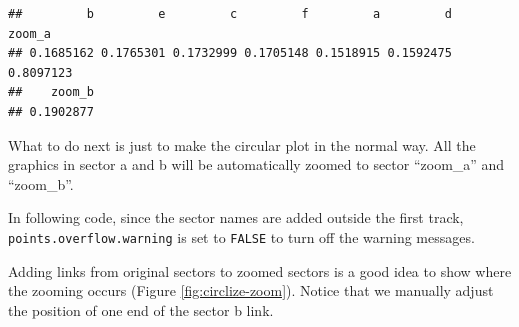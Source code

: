 \documentclass[]{book}
\newenvironment{Shaded}{\begin{snugshade}}{\end{snugshade}}
\newcommand{\KeywordTok}[1]{\textcolor[rgb]{0.13,0.29,0.53}{\textbf{#1}}}
\newcommand{\DataTypeTok}[1]{\textcolor[rgb]{0.13,0.29,0.53}{#1}}
\newcommand{\DecValTok}[1]{\textcolor[rgb]{0.00,0.00,0.81}{#1}}
\newcommand{\FloatTok}[1]{\textcolor[rgb]{0.00,0.00,0.81}{#1}}
\newcommand{\StringTok}[1]{\textcolor[rgb]{0.31,0.60,0.02}{#1}}
\newcommand{\OtherTok}[1]{\textcolor[rgb]{0.56,0.35,0.01}{#1}}
\newcommand{\ControlFlowTok}[1]{\textcolor[rgb]{0.13,0.29,0.53}{\textbf{#1}}}
\newcommand{\OperatorTok}[1]{\textcolor[rgb]{0.81,0.36,0.00}{\textbf{#1}}}
\newcommand{\NormalTok}[1]{#1}
\begin{document}
\begin{verbatim}
##         b         e         c         f         a         d    zoom_a 
## 0.1685162 0.1765301 0.1732999 0.1705148 0.1518915 0.1592475 0.8097123 
##    zoom_b 
## 0.1902877
\end{verbatim}

What to do next is just to make the circular plot in the normal way. All
the graphics in sector a and b will be automatically zoomed to sector
``zoom\_a'' and ``zoom\_b''.

In following code, since the sector names are added outside the first
track, \texttt{points.overflow.warning} is set to \texttt{FALSE} to turn
off the warning messages.

\begin{Shaded}
\end{Shaded}

Adding links from original sectors to zoomed sectors is a good idea to
show where the zooming occurs (Figure \ref{fig:circlize-zoom}). Notice
that we manually adjust the position of one end of the sector b link.
\end{document}
